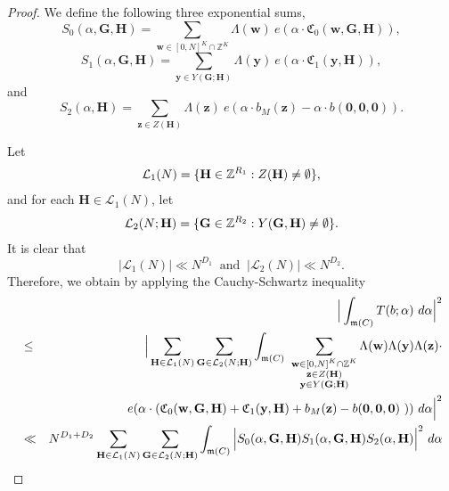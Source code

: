 \documentclass[12pt]{amsart}
\theoremstyle{definition}
\theoremstyle{remark}
\numberwithin{equation}{section}
\begin{document}
\begin{proof}
We define the following three exponential sums,
$$
S_0( {\alpha}, \mathbf{G}, \mathbf{H} ) = \sum_{ \mathbf{w} \in [0,N]^K \cap \mathbb{Z}^K } \Lambda (\mathbf{w})
\ e(  {\alpha} \cdot \mathfrak{C}_0 (\mathbf{w}, \mathbf{G}, \mathbf{H}  )  ),
$$
$$
S_1( {\alpha}, \mathbf{G}, \mathbf{H}) = \sum_{\mathbf{y} \in Y(\mathbf{G};\mathbf{H})} \Lambda (\mathbf{y}) \  e( {\alpha} \cdot \mathfrak{C}_1 (\mathbf{y}, \mathbf{H}  )  ),
$$
and
$$
S_2( {\alpha}, \mathbf{H} ) = \sum_{\mathbf{z} \in Z(\mathbf{H}) } \Lambda (\mathbf{z}) \ e(  {\alpha} \cdot   b_M(\mathbf{z}) - {\alpha} \cdot b(\mathbf{0}, \mathbf{0}, \mathbf{0}) ).
$$

Let
\begin{eqnarray}
\mathcal{L}_1(N) 
= \{ \mathbf{H} \in \mathbb{Z}^{R_1} : Z(\mathbf{H}) \not = \emptyset \},
\notag
\end{eqnarray}
and for each $\mathbf{H} \in \mathcal{L}_1(N)$,  let
\begin{eqnarray}
\mathcal{L}_2(N ; \mathbf{H}) 
= \{ \mathbf{G} \in \mathbb{Z}^{R_2} : Y(\mathbf{G}, \mathbf{H} ) \not = \emptyset \}.
\notag
\end{eqnarray}
It is clear that
$$
|\mathcal{L}_1(N)| \ll N^{D_1} \  \mbox{ and } \  |\mathcal{L}_2(N)| \ll N^{D_2}.
$$
Therefore, we obtain by applying the Cauchy-Schwartz inequality
\begin{eqnarray}
\label{minor arc ineq 1}
&& \Big{|} \int_{\mathfrak{m}(C)} T({b}; {\alpha} ) \ {d} {\alpha}  \Big{|}^2
\\
&\leq&
\Big{|}
\sum_{\mathbf{H} \in \mathcal{L}_1(N)} \sum_{\mathbf{G} \in \mathcal{L}_2(N ; \mathbf{H})} \int_{\mathfrak{m}(C)} \
\sum_{\substack{ \mathbf{w} \in [0,N]^K \cap \mathbb{Z}^K \\ \mathbf{z} \in Z(\mathbf{H}) \\  \mathbf{y} \in Y(\mathbf{G}; \mathbf{H}) }}
\Lambda(\mathbf{w}) \Lambda(\mathbf{y}) \Lambda(\mathbf{z}) \cdot
\notag
\\
&&\phantom{12345612345}
e( {\alpha} \cdot (\mathfrak{C}_0 (\mathbf{w}, \mathbf{G}, \mathbf{H}  ) + \mathfrak{C}_1 (\mathbf{y}, \mathbf{H} ) + {b}_M( \mathbf{z} ) - b(\mathbf{0}, \mathbf{0}, \mathbf{0})  \  ))
\  {d} {\alpha}  \Big{|}^2
\notag
\\
&\ll&
N^{D_1+ D_2}
\sum_{\mathbf{H} \in \mathcal{L}_1(N)} \sum_{\mathbf{G} \in \mathcal{L}_2(N ; \mathbf{H})} \int_{\mathfrak{m}(C)}
\Big{|}   S_0 ( {\alpha}, \mathbf{G}, \mathbf{H} )
S_1( {\alpha}, \mathbf{G}, \mathbf{H} )S_2( {\alpha}, \mathbf{H} )
\Big{|}^2 \  {d}  {\alpha}
\notag
\\

\end{eqnarray}
\end{proof}
\end{document}
